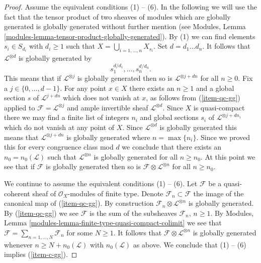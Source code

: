 \begin{proof}
\medskip\noindent
Assume the equivalent conditions (1) -- (6). In the following
we will use the fact that the tensor product of two sheaves of
modules which are globally generated is globally generated without
further mention (see
Modules, Lemma \ref{modules-lemma-tensor-product-globally-generated}).
By (1) we can find elements $s_i \in S_{d_i}$ with $d_i \geq 1$
such that $X = \bigcup_{i = 1, \ldots, n} X_{s_i}$.
Set $d = d_1\ldots d_n$. It follows that $\mathcal{L}^{\otimes d}$
is globally generated by
$$
s_1^{d/d_1}, \ldots, s_n^{d/d_n}.
$$
This means that if $\mathcal{L}^{\otimes j}$ is globally generated
then so is $\mathcal{L}^{\otimes j + dn}$ for all $n \geq 0$.
Fix a $j \in \{0, \ldots, d - 1\}$. For any point $x \in X$ there
exists an $n \geq 1$ and a global section $s$ of $\mathcal{L}^{j + dn}$
which does not vanish at $x$, as follows from (\ref{item-qc-gg}) applied
to $\mathcal{F} = \mathcal{L}^{\otimes j}$ and ample invertible
sheaf $\mathcal{L}^{\otimes d}$. Since $X$ is quasi-compact there
we may find a finite list of integers $n_{i}$ and global sections
$s_i$ of $\mathcal{L}^{\otimes j + dn_{i}}$ which do not vanish at any point
of $X$. Since $\mathcal{L}^{\otimes d}$ is globally generated this means that
$\mathcal{L}^{\otimes j + dn}$ is globally generated where $n = \max\{n_i\}$.
Since we proved this for every congruence class mod $d$ we
conclude that there exists an $n_0 = n_0(\mathcal{L})$ such that
$\mathcal{L}^{\otimes n}$ is globally generated for all $n \geq n_0$.
At this point we see that if $\mathcal{F}$ is globally generated then
so is $\mathcal{F}\otimes \mathcal{L}^{\otimes n}$ for all
$n \geq n_0$.

\medskip\noindent
We continue to assume the equivalent conditions (1) -- (6).
Let $\mathcal{F}$ be a quasi-coherent
sheaf of $\mathcal{O}_X$-modules of finite type.
Denote $\mathcal{F}_n \subset \mathcal{F}$ the image of the canonical
map of (\ref{item-qc-gg}). By construction
$\mathcal{F}_n \otimes \mathcal{L}^{\otimes n}$ is
globally generated. By (\ref{item-qc-gg}) we see
$\mathcal{F}$ is the sum of the subsheaves $\mathcal{F}_n$,
$n \geq 1$. By
Modules, Lemma \ref{modules-lemma-finite-type-quasi-compact-colimit}
we see that $\mathcal{F} = \sum_{n = 1, \ldots, N} \mathcal{F}_n$
for some $N \geq 1$. It follows that
$\mathcal{F} \otimes \mathcal{L}^{\otimes n}$ is globally
generated whenever $n \geq N + n_0(\mathcal{L})$ with $n_0(\mathcal{L})$
as above. We conclude that (1) -- (6) implies (\ref{item-c-gg}).


\end{proof}
